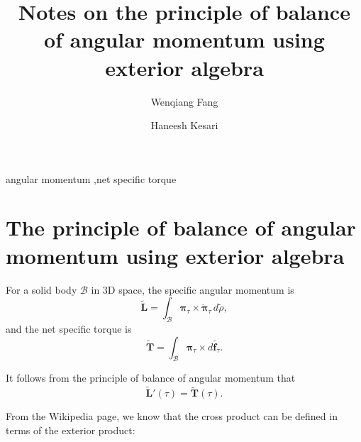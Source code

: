 \documentclass[preprint,12pt]{elsarticle}
\numberwithin{equation}{section}
\begin{document}
%
\clearpage

\title{Notes on the principle of balance of angular momentum using exterior algebra
}

\author[1]{Wenqiang Fang}
\author[1]{Haneesh Kesari}
\address[1]{Brown University School of Engineering, 184 Hope St., Providence, RI, USA}
\begin{keyword}
angular momentum \sep net specific torque
\end{keyword}
{}


\maketitle


\section{
The principle of balance of angular momentum using exterior algebra
}
\label{sec:Exterior}
 
For a solid body $\mathcal{B}$ in 3D space, the specific angular momentum is 
\begin{equation}
\label{eq:AM}
\tilde{\boldsymbol{L}} = \int_{\mathcal{B}} \boldsymbol{\pi}_{\tau} \times \dot{\boldsymbol{\pi}}_{\tau} \, d\tilde{\rho},
\end{equation}
and the net specific torque is 
\begin{equation}
\label{eq:NT}
\tilde{\boldsymbol{T}} = \int_{\mathcal{B}} \boldsymbol{\pi}_{\tau} \times  d\tilde{\boldsymbol{f}_{\tau}}.
\end{equation}

It follows from the principle of balance of angular momentum that 
\begin{equation}
\tilde{\boldsymbol{L}}'(\tau) = \tilde{\boldsymbol{T}} (\tau).
\end{equation}

From the Wikipedia page, we know that the cross product can be defined in terms of the exterior product:
\end{document}
